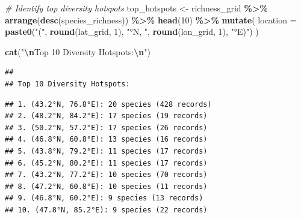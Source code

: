 \documentclass[
]{article}
\newenvironment{Shaded}{\begin{snugshade}}{\end{snugshade}}
\newcommand{\AttributeTok}[1]{\textcolor[rgb]{0.13,0.29,0.53}{#1}}
\newcommand{\CommentTok}[1]{\textcolor[rgb]{0.56,0.35,0.01}{\textit{#1}}}
\newcommand{\ControlFlowTok}[1]{\textcolor[rgb]{0.13,0.29,0.53}{\textbf{#1}}}
\newcommand{\DecValTok}[1]{\textcolor[rgb]{0.00,0.00,0.81}{#1}}
\newcommand{\FunctionTok}[1]{\textcolor[rgb]{0.13,0.29,0.53}{\textbf{#1}}}
\newcommand{\NormalTok}[1]{#1}
\newcommand{\OtherTok}[1]{\textcolor[rgb]{0.56,0.35,0.01}{#1}}
\newcommand{\SpecialCharTok}[1]{\textcolor[rgb]{0.81,0.36,0.00}{\textbf{#1}}}
\newcommand{\StringTok}[1]{\textcolor[rgb]{0.31,0.60,0.02}{#1}}
\begin{document}
\begin{Shaded}
\begin{Highlighting}[]
\CommentTok{\# Identify top diversity hotspots}
\NormalTok{top\_hotspots }\OtherTok{\textless{}{-}}\NormalTok{ richness\_grid }\SpecialCharTok{\%\textgreater{}\%}
  \FunctionTok{arrange}\NormalTok{(}\FunctionTok{desc}\NormalTok{(species\_richness)) }\SpecialCharTok{\%\textgreater{}\%}
  \FunctionTok{head}\NormalTok{(}\DecValTok{10}\NormalTok{) }\SpecialCharTok{\%\textgreater{}\%}
  \FunctionTok{mutate}\NormalTok{(}
    \AttributeTok{location =} \FunctionTok{paste0}\NormalTok{(}\StringTok{"("}\NormalTok{, }\FunctionTok{round}\NormalTok{(lat\_grid, }\DecValTok{1}\NormalTok{), }\StringTok{"°N, "}\NormalTok{, }\FunctionTok{round}\NormalTok{(lon\_grid, }\DecValTok{1}\NormalTok{), }\StringTok{"°E)"}\NormalTok{)}
\NormalTok{  )}

\FunctionTok{cat}\NormalTok{(}\StringTok{"}\SpecialCharTok{\textbackslash{}n}\StringTok{Top 10 Diversity Hotspots:}\SpecialCharTok{\textbackslash{}n}\StringTok{"}\NormalTok{)}
\end{Highlighting}
\end{Shaded}

\begin{verbatim}
## 
## Top 10 Diversity Hotspots:
\end{verbatim}

\begin{Shaded}
\end{Shaded}

\begin{verbatim}
## 1. (43.2°N, 76.8°E): 20 species (428 records)
## 2. (48.2°N, 84.2°E): 17 species (19 records)
## 3. (50.2°N, 57.2°E): 17 species (26 records)
## 4. (46.8°N, 60.8°E): 13 species (16 records)
## 5. (43.8°N, 79.2°E): 11 species (17 records)
## 6. (45.2°N, 80.2°E): 11 species (17 records)
## 7. (43.2°N, 77.2°E): 10 species (70 records)
## 8. (47.2°N, 60.8°E): 10 species (11 records)
## 9. (46.8°N, 60.2°E): 9 species (13 records)
## 10. (47.8°N, 85.2°E): 9 species (22 records)
\end{verbatim}
\end{document}
